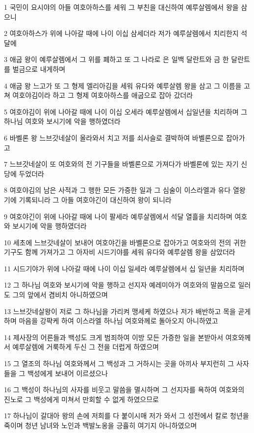 \par 1 국민이 요시야의 아들 여호아하스를 세워 그 부친을 대신하여 예루살렘에서 왕을 삼으니
\par 2 여호아하스가 위에 나아갈 때에 나이 이십 삼세더라 저가 예루살렘에서 치리한지 석달에
\par 3 애굽 왕이 예루살렘에서 그 위를 폐하고 또 그 나라로 은 일백 달란트와 금 한 달란트를 벌금으로 내게하며
\par 4 애굽 왕 느고가 또 그 형제 엘리아김을 세워 유다와 예루살렘 왕을 삼고 그 이름을 고쳐 여호야김이라 하고 그 형제 여호아하스를 애굽으로 잡아 갔더라
\par 5 여호야김이 위에 나아갈 때에 나이 이십 오세라 예루살렘에서 십일년을 치리하며 그 하나님 여호와 보시기에 악을 행하였더라
\par 6 바벨론 왕 느브갓네살이 올라와서 치고 저를 쇠사슬로 결박하여 바벨론으로 잡아가고
\par 7 느브갓네살이 또 여호와의 전 기구들을 바벨론으로 가져다가 바벨론에 있는 자기 신당에 두었더라
\par 8 여호야김의 남은 사적과 그 행한 모든 가증한 일과 그 심술이 이스라엘과 유다 열왕기에 기록되니라 그 아들 여호야긴이 대신하여 왕이 되니라
\par 9 여호야긴이 위에 나아갈 때에 나이 팔세라 예루살렘에서 석달 열흘을 치리하며 여호와 보시기에 악을 행하였더라
\par 10 세초에 느브갓네살이 보내어 여호야긴을 바벨론으로 잡아가고 여호와의 전의 귀한 기구도 함께 가져가고 그 아자비 시드기야를 세워 유다와 예루살렘 왕을 삼았더라
\par 11 시드기야가 위에 나아갈 때에 나이 이십 일세라 예루살렘에서 십 일년을 치리하며
\par 12 그 하나님 여호와 보시기에 악을 행하고 선지자 예레미야가 여호와의 말씀으로 일러도 그의 앞에서 겸비치 아니하였으며
\par 13 느브갓네살왕이 저로 그 하나님을 가리켜 맹세케 하였으나 저가 배반하고 목을 곧게 하며 마음을 강퍅케 하여 이스라엘 하나님 여호와께로 돌아오지 아니하였고
\par 14 제사장의 어른들과 백성도 크게 범죄하여 이방 모든 가증한 일을 본받아서 여호와께서 예루살렘에 거룩하게 두신 그 전을 더럽게 하였으며
\par 15 그 열조의 하나님 여호와께서 그 백성과 그 거하시는 곳을 아끼사 부지런히 그 사자들을 그 백성에게 보내어 이르셨으나
\par 16 그 백성이 하나님의 사자를 비웃고 말씀을 멸시하며 그 선지자를 욕하여 여호와의 진노로 그 백성에게 미쳐서 만회할 수 없게 하였으므로
\par 17 하나님이 갈대아 왕의 손에 저희를 다 붙이시매 저가 와서 그 성전에서 칼로 청년을 죽이며 청년 남녀와 노인과 백발노옹을 긍휼히 여기지 아니하였으며
